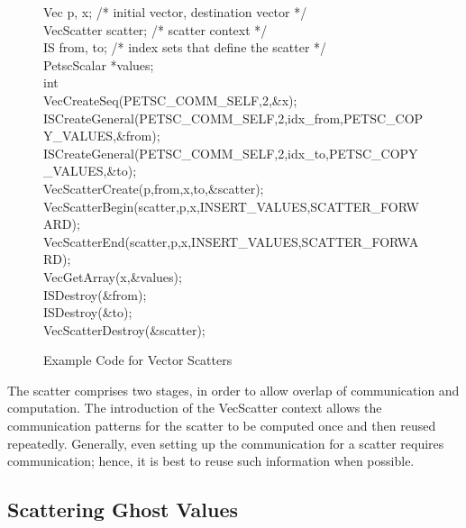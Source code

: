 \begin{figure}[tb]
\begin{tabbing}
   Vec         p, x;         /* initial vector, destination vector */\\
   VecScatter  scatter;      /* scatter context */\\
   IS          from, to;     /* index sets that define the scatter */\\
   PetscScalar *values;\\
   int         \\

   VecCreateSeq(PETSC\_COMM\_SELF,2,\&x);\\
   ISCreateGeneral(PETSC\_COMM\_SELF,2,idx\_from,PETSC\_COPY\_VALUES,\&from);\\
   ISCreateGeneral(PETSC\_COMM\_SELF,2,idx\_to,PETSC\_COPY\_VALUES,\&to);\\
   VecScatterCreate(p,from,x,to,\&scatter);\\
   VecScatterBegin(scatter,p,x,INSERT\_VALUES,SCATTER\_FORWARD);\\
   VecScatterEnd(scatter,p,x,INSERT\_VALUES,SCATTER\_FORWARD);\\
   VecGetArray(x,\&values);\\
   ISDestroy(\&from);\\
   ISDestroy(\&to); \\
   VecScatterDestroy(\&scatter);
\end{tabbing}
\caption{Example Code for Vector Scatters}
\label{fig_vecscatter}
\end{figure}

The scatter comprises two stages, in order to allow overlap of
communication and computation. The introduction of the
VecScatter context allows the communication patterns for the scatter
to be computed once and then reused repeatedly. Generally, even
setting up the communication for a scatter requires communication;
hence, it is best to reuse such information when possible.

\subsection{Scattering Ghost Values}

